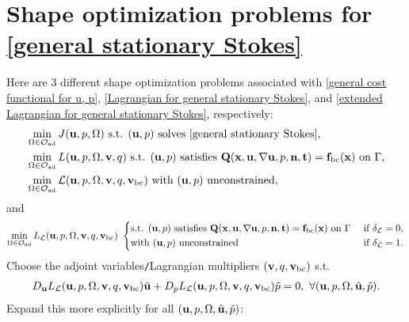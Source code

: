\documentclass[oneside,11pt]{book}
\numberwithin{equation}{section}
\begin{document}
\section{Shape optimization problems for \eqref{general stationary Stokes}}
Here are 3 different shape optimization problems associated with \eqref{general cost functional for u, p}, \eqref{Lagrangian for general stationary Stokes}, and \eqref{extended Lagrangian for general stationary Stokes}, respectively:
\begin{align*}
    &\min_{\Omega\in\mathcal{O}_{\rm ad}} J({\bf u},p,\Omega) \mbox{ s.t. } ({\bf u},p) \mbox{ solves \eqref{general stationary Stokes}},\\
    &\min_{\Omega\in\mathcal{O}_{\rm ad}} L({\bf u},p,\Omega,{\bf v},q) \mbox{ s.t. } ({\bf u},p)\mbox{ satisfies }{\bf Q}({\bf x},{\bf u},\nabla{\bf u},p,{\bf n},{\bf t}) = {\bf f}_{\rm bc}({\bf x})\mbox{ on }\Gamma,\\
    &\min_{\Omega\in\mathcal{O}_{\rm ad}} \mathcal{L}({\bf u},p,\Omega,{\bf v},q,{\bf v}_{\rm bc}) \mbox{ with } ({\bf u},p) \mbox{ unconstrained},
\end{align*}
and
\begin{equation*}
    \min_{\Omega\in\mathcal{O}_{\rm ad}} L_{\mathcal{L}}({\bf u},p,\Omega,{\bf v},q,{\bf v}_{\rm bc})\ \left\{\begin{split}
        &\mbox{s.t. } ({\bf u},p) \mbox{ satisfies } {\bf Q}({\bf x},{\bf u},\nabla{\bf u},p,{\bf n},{\bf t}) = {\bf f}_{\rm bc}({\bf x})\mbox{ on }\Gamma &&\mbox{ if } \delta_{\mathcal{L}} = 0,\\
        &\mbox{with } ({\bf u},p) \mbox{ unconstrained} &&\mbox{ if } \delta_{\mathcal{L}} = 1.
    \end{split}\right.
\end{equation*}
Choose the adjoint variables\texttt{/}Lagrangian multipliers $({\bf v},q,{\bf v}_{\rm bc})$ s.t.
\begin{align*}
    D_{\bf u}L_{\mathcal{L}}({\bf u},p,\Omega,{\bf v},q,{\bf v}_{\rm bc})\tilde{\bf u} + D_pL_{\mathcal{L}}({\bf u},p,\Omega,{\bf v},q,{\bf v}_{\rm bc})\tilde{p} = 0,\ \forall({\bf u},p,\Omega,\tilde{\bf u},\tilde{p}).
\end{align*}
Expand this more explicitly for all $({\bf u},p,\Omega,\tilde{\bf u},\tilde{p})$:
\end{document}
